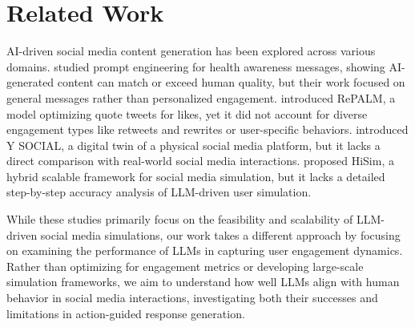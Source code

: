 \section{Related Work}
AI-driven social media content generation has been explored across various domains. \citet{lim2023artificial} studied prompt engineering for health awareness messages, showing AI-generated content can match or exceed human quality, but their work focused on general messages rather than personalized engagement. \citet{yu2024repalm} introduced RePALM, a model optimizing quote tweets for likes, yet it did not account for diverse engagement types like retweets and rewrites or user-specific behaviors. \citet{rossetti2024social} introduced Y SOCIAL, a digital twin of a physical social media platform, but it lacks a direct comparison with real-world social media interactions. \citet{dmonte2024classifying} proposed HiSim, a hybrid scalable framework for social media simulation, but it lacks a detailed step-by-step accuracy analysis of LLM-driven user simulation. 

While these studies primarily focus on the feasibility and scalability of LLM-driven social media simulations, our work takes a different approach by focusing on examining the performance of LLMs in capturing user engagement dynamics.
Rather than optimizing for engagement metrics or developing large-scale simulation frameworks, we aim to understand how well LLMs align with human behavior in social media interactions, investigating both their successes and limitations in action-guided response generation.